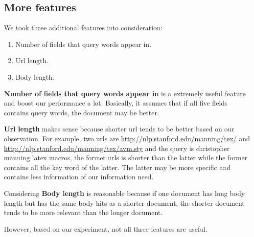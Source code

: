 \documentclass{article}
\begin{document}
\subsection{More features}

We took three additional features into consideration:

\begin{enumerate}
    \item Number of fields that query words appear in.
    \item Url length.
    \item Body length.
\end{enumerate}

\textbf{Number of fields that query words appear in} is a extremely useful feature and boost our performance a lot. Basically, it assumes that if all five fields contains query words, the document may be better.

\textbf{Url length} makes sense because shorter url tends to be better based on our observation. For example, two urls are \url{http://nlp.stanford.edu/manning/tex/} and \url{http://nlp.stanford.edu/manning/tex/avm.sty} and the query is christopher manning latex macros, the former urls is shorter than the latter while the former contains all the key word of the latter. The latter may be more specific and contains less information of our information need.

Considering \textbf{Body length} is reasonable because if one document has long body length but has the same body hits as a shorter document, the shorter document tends to be more relevant than the longer document.

However, based on our experiment, not all three features are useful.
\end{document}
